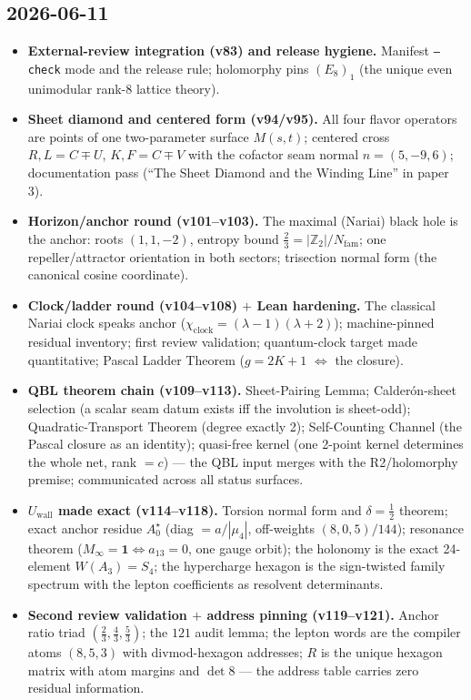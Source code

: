 \subsection*{2026-06-11}
\begin{itemize}
\item \textbf{External-review integration (v83) and release hygiene.} Manifest
  \texttt{--check} mode and the release rule; holomorphy pins $(E_8)_1$ (the unique even
  unimodular rank-8 lattice theory).
\item \textbf{Sheet diamond and centered form (v94/v95).} All four flavor operators are
  points of one two-parameter surface $M(s,t)$; centered cross $R,L=C\mp U$, $K,F=C\mp V$
  with the cofactor seam normal $n=(5,-9,6)$; documentation pass (``The Sheet Diamond and
  the Winding Line'' in paper 3).
\item \textbf{Horizon/anchor round (v101--v103).} The maximal (Nariai) black hole is the
  anchor: roots $(1,1,-2)$, entropy bound $\tfrac23=|\mathbb Z_2|/N_{\mathrm{fam}}$; one
  repeller/attractor orientation in both sectors; trisection normal form (the canonical
  cosine coordinate).
\item \textbf{Clock/ladder round (v104--v108) $+$ Lean hardening.} The classical Nariai
  clock speaks anchor ($\chi_{\mathrm{clock}}=(\lambda-1)(\lambda+2)$); machine-pinned
  residual inventory; first review validation; quantum-clock target made quantitative;
  Pascal Ladder Theorem ($g=2K+1$ $\Leftrightarrow$ the closure).
\item \textbf{QBL theorem chain (v109--v113).} Sheet-Pairing Lemma; Calder\'on-sheet
  selection (a scalar seam datum exists iff the involution is sheet-odd); Quadratic-Transport
  Theorem (degree exactly 2); Self-Counting Channel (the Pascal closure as an identity);
  quasi-free kernel (one 2-point kernel determines the whole net, rank $=c$) --- the QBL
  input merges with the R2/holomorphy premise; communicated across all status surfaces.
\item \textbf{$U_{\mathrm{wall}}$ made exact (v114--v118).} Torsion normal form and
  $\delta=\tfrac12$ theorem; exact anchor residue $A_0^\star$ (diag $=a/|\mu_4|$,
  off-weights $(8,0,5)/144$); resonance theorem ($M_\infty=\mathbf 1\iff a_{13}=0$, one gauge
  orbit); the holonomy is the exact 24-element $W(A_3)=S_4$; the hypercharge hexagon is the
  sign-twisted family spectrum with the lepton coefficients as resolvent determinants.
\item \textbf{Second review validation $+$ address pinning (v119--v121).} Anchor ratio triad
  $(\tfrac23,\tfrac43,\tfrac53)$; the $121$ audit lemma; the lepton words are the compiler
  atoms $(8,5,3)$ with divmod-hexagon addresses; $R$ is the unique hexagon matrix with atom
  margins and $\det 8$ --- the address table carries zero residual information.
\end{itemize}

